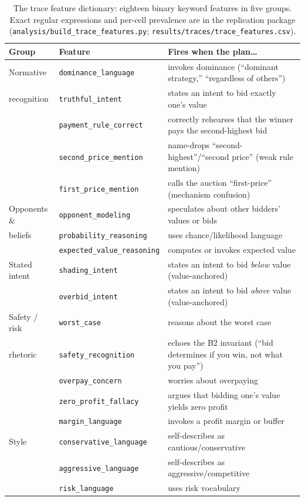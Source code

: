 \begin{table}[htbp]
\centering
\footnotesize
\setlength{\tabcolsep}{5pt}
\begin{tabular}{llp{8.2cm}}
\toprule
Group & Feature & Fires when the plan\ldots \\
\midrule
Normative & \texttt{dominance\_language} & invokes dominance (``dominant strategy,'' ``regardless of others'') \\
recognition & \texttt{truthful\_intent} & states an intent to bid exactly one's value \\
& \texttt{payment\_rule\_correct} & correctly rehearses that the winner pays the second-highest bid \\
& \texttt{second\_price\_mention} & name-drops ``second-highest''/``second price'' (weak rule mention) \\
& \texttt{first\_price\_mention} & calls the auction ``first-price'' (mechanism confusion) \\
\addlinespace
Opponents \& & \texttt{opponent\_modeling} & speculates about other bidders' values or bids \\
beliefs & \texttt{probability\_reasoning} & uses chance/likelihood language \\
& \texttt{expected\_value\_reasoning} & computes or invokes expected value \\
\addlinespace
Stated intent & \texttt{shading\_intent} & states an intent to bid \emph{below} value (value-anchored) \\
& \texttt{overbid\_intent} & states an intent to bid \emph{above} value (value-anchored) \\
\addlinespace
Safety / risk & \texttt{worst\_case} & reasons about the worst case \\
rhetoric & \texttt{safety\_recognition} & echoes the B2 invariant (``bid determines if you win, not what you pay'') \\
& \texttt{overpay\_concern} & worries about overpaying \\
& \texttt{zero\_profit\_fallacy} & argues that bidding one's value yields zero profit \\
& \texttt{margin\_language} & invokes a profit margin or buffer \\
\addlinespace
Style & \texttt{conservative\_language} & self-describes as cautious/conservative \\
& \texttt{aggressive\_language} & self-describes as aggressive/competitive \\
& \texttt{risk\_language} & uses risk vocabulary \\
\bottomrule
\end{tabular}
\caption{The trace feature dictionary: eighteen binary keyword features in five groups. Exact regular expressions and per-cell prevalence are in the replication package (\texttt{analysis/build\_trace\_features.py}; \texttt{results/traces/trace\_features.csv}).}
\label{tab:trace-dictionary}
\end{table}

